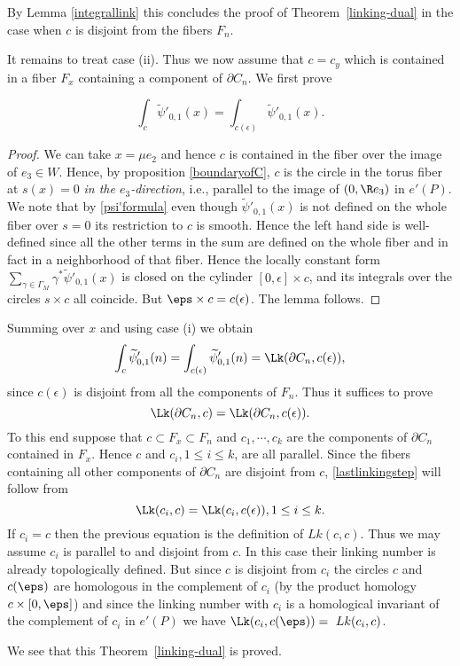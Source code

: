 By Lemma \ref{integrallink} this concludes the proof of Theorem~\ref{linking-dual} in the case when $c$ is disjoint from the fibers $F_n$.


It remains to treat case (ii). 
Thus we now assume that $c=c_y$ which is contained in a fiber $F_x$ containing a component  of $\partial C_n$.  We first prove
\begin{lemma}\label{selflinkingforx}
\[
\int_{c} \widetilde{\psi}'_{0,1}(x) =
\int_{c(\epsilon)}  \widetilde{\psi}'_{0,1}(x).
\]
\end{lemma}
\begin{proof} 
We can take $x = \mu e_2$ and hence $c$ is contained in the fiber over the image of $e_3 \in W$. Hence, by proposition \ref{boundaryofC}, $c $ is the circle in 
the torus fiber at $s(x )=0$ {\it in the $e_3$-direction}, 
i.e., parallel to the image of $(0,\R e_3)$ in $e'(P)$. 
We note that by \eqref{psi'formula} even though 
$\widetilde{\psi}'_{0,1}(x)$ is not defined on the 
whole fiber over $s=0$ its restriction to $c$ is smooth. 
Hence the left hand side is well-defined since all the 
other terms in the sum are defined on the whole fiber 
and in fact in a neighborhood of that fiber. Hence the 
locally constant form $\sum_{\gamma \in \Gamma_M} \gamma^* \widetilde{\psi}'_{0,1}(x)$ 
is closed on the cylinder $[0, \epsilon] \times c $, 
and its integrals over the circles $s \times c $ all 
coincide. But $ \eps \times c = c(\epsilon)$. The lemma follows. 
\end{proof} 
Summing over $x$ and using case (i) we obtain
\[
\int_{c} \widetilde{\psi}'_{0,1}(n) =\int_{c(\epsilon)}  \widetilde{\psi}'_{0,1}(n) = \Lk(\partial C_n ,c(\epsilon)),
\]
since $c(\epsilon)$ is disjoint from all the components of $F_n$. Thus it suffices to prove 
\begin{equation}\label{lastlinkingstep}
\Lk(\partial C_n, c) = \Lk(\partial C_n, c(\epsilon)).
\end{equation}
To this end suppose that $c \subset F_x \subset F_n$ and $c_1,\cdots,c_k$ are the components of $\partial C_n$ contained in $F_x$. Hence
$c$ and $c_i,1 \leq i \leq k$, are all parallel. Since the fibers containing all other components of $\partial C_n$ are disjoint from $c$, \eqref{lastlinkingstep} will follow from
\[
\Lk(c_i,c) = \Lk(c_i, c(\epsilon)), 1 \leq i \leq k.
\]
If $c_i = c$ then the previous equation is the definition of $Lk(c,c)$. Thus we may assume $c_i$ is parallel to and disjoint from $c$. 
In this case their linking number is already topologically defined.
But since $c$ is disjoint from $c_i$ the circles $c$ and $c(\eps)$
are homologous in the complement of $c_i$ (by the product homology
$c \times [0,\eps]$) and since the linking number with $c_i$ is a
homological invariant of the complement of $c_i$ in $e'(P)$ we have
$\Lk(c_i, c(\eps)) =\ Lk(c_i, c)$.

We see that this Theorem~\ref{linking-dual} is proved. 




